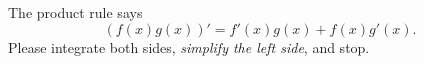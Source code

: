 The product rule says
    $$\left(f(x) g(x)\right)' = f'(x) g(x) + f(x) g'(x).$$
Please integrate both sides, \emph{simplify the left side}, and stop.
